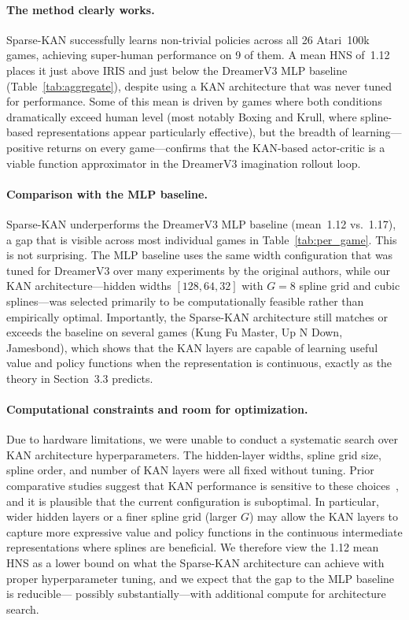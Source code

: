 \documentclass[11pt, a4paper]{article}
\begin{document}
\paragraph{The method clearly works.}
Sparse-KAN successfully learns non-trivial policies across all 26 Atari~100k games,
achieving super-human performance on 9 of them.  A mean HNS of~1.12 places it
just above IRIS and just below the DreamerV3 MLP baseline (Table~\ref{tab:aggregate}),
despite using a KAN architecture that was never tuned for performance.  Some of this mean is driven by games where
both conditions dramatically exceed human level (most notably Boxing and Krull, where
spline-based representations appear particularly effective), but the breadth of
learning---positive returns on every game---confirms that the KAN-based actor-critic
is a viable function approximator in the DreamerV3 imagination rollout loop.

\paragraph{Comparison with the MLP baseline.}
Sparse-KAN underperforms the DreamerV3 MLP baseline (mean~1.12 vs.~1.17), a gap
that is visible across most individual games in Table~\ref{tab:per_game}.  This is
not surprising.  The MLP baseline uses the same width configuration that was tuned
for DreamerV3 over many experiments by the original authors, while our KAN
architecture---hidden widths $[128, 64, 32]$ with $G=8$ spline grid and cubic
splines---was selected primarily to be computationally feasible rather than
empirically optimal.  Importantly, the Sparse-KAN architecture still matches or
exceeds the baseline on several games (Kung Fu Master, Up N Down, Jamesbond), which
shows that the KAN layers are capable of learning useful value and policy functions
when the representation is continuous, exactly as the theory in
Section~3.3 predicts.

\paragraph{Computational constraints and room for optimization.}
Due to hardware limitations, we were unable to conduct a systematic search over KAN
architecture hyperparameters.  The hidden-layer widths, spline grid size, spline order,
and number of KAN layers were all fixed without tuning.  Prior comparative studies
suggest that KAN performance is sensitive to these choices~\cite{kanvmlp2024}, and
it is plausible that the current configuration is suboptimal.  In particular, wider
hidden layers or a finer spline grid (larger $G$) may allow the KAN layers to capture
more expressive value and policy functions in the continuous intermediate
representations where splines are beneficial.  We therefore view the 1.12 mean HNS
as a lower bound on what the Sparse-KAN architecture can achieve with proper
hyperparameter tuning, and we expect that the gap to the MLP baseline is reducible---
possibly substantially---with additional compute for architecture search.
\end{document}
